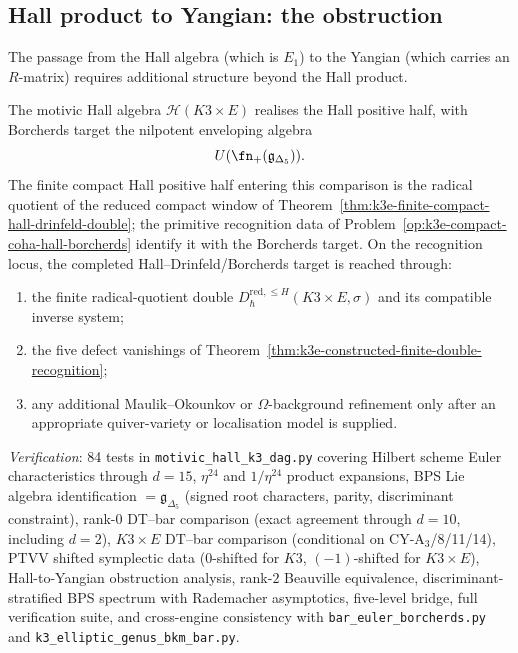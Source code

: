 \subsection{Hall product to Yangian: the obstruction}
\label{subsec:k3e-hall-yangian-obstruction}

The passage from the Hall algebra (which is $E_1$) to the Yangian (which carries an $R$-matrix) requires additional structure beyond the Hall product.

\begin{proposition}
\label{prop:k3e-hall-yangian}
The motivic Hall algebra $\mathcal{H}(K3 \times E)$ realises the Hall
positive half, with Borcherds target the nilpotent enveloping algebra
\[
 U(\fn_+(\mathfrak{g}_{\Delta_5})).
\]
The finite compact Hall positive half entering this comparison is the
radical quotient of the reduced compact window of
Theorem~\ref{thm:k3e-finite-compact-hall-drinfeld-double}; the primitive
recognition data of Problem~\ref{op:k3e-compact-coha-hall-borcherds}
identify it with the Borcherds target. On the recognition locus, the
completed Hall--Drinfeld/Borcherds target is reached through:
\begin{enumerate}[label=(\alph*)]
 \item the finite radical-quotient double
 \(D^{\mathrm{red},\leq H}_{\hbar}(K3\times E,\sigma)\) and its
 compatible inverse system;
 \item the five defect vanishings of
 Theorem~\ref{thm:k3e-constructed-finite-double-recognition};
 \item any additional Maulik--Okounkov or \(\Omega\)-background
 refinement only after an appropriate quiver-variety or localisation
 model is supplied.
\end{enumerate}
\end{proposition}

\noindent\textit{Verification}: 84 tests in \texttt{motivic\_hall\_k3\_dag.py} covering Hilbert scheme Euler characteristics through $d = 15$, $\eta^{24}$ and $1/\eta^{24}$ product expansions, BPS Lie algebra identification $= \mathfrak{g}_{\Delta_5}$ (signed root characters, parity, discriminant constraint), rank-$0$ DT--bar comparison (exact agreement through $d = 10$, including $d = 2$), $K3 \times E$ DT--bar comparison (conditional on CY-A$_3$/8/11/14), PTVV shifted symplectic data ($0$-shifted for $K3$, $(-1)$-shifted for $K3 \times E$), Hall-to-Yangian obstruction analysis, rank-$2$ Beauville equivalence, discriminant-stratified BPS spectrum with Rademacher asymptotics, five-level bridge, full verification suite, and cross-engine consistency with \texttt{bar\_euler\_borcherds.py} and \texttt{k3\_elliptic\_genus\_bkm\_bar.py}.





